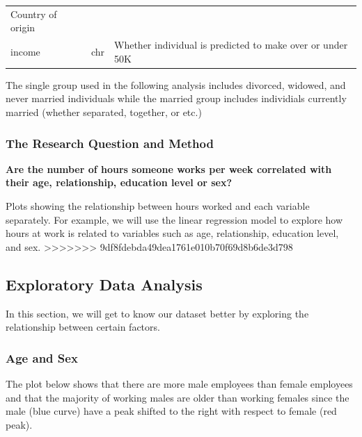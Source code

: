 \documentclass[]{article}
\begin{document}
\begin{longtable}[]{@{}lll@{}}
\begin{minipage}[t]{0.26\columnwidth}
Country of origin\strut
\end{minipage}\tabularnewline
\begin{minipage}[t]{0.35\columnwidth}\raggedright
income\strut
\end{minipage} & \begin{minipage}[t]{0.30\columnwidth}\raggedright
chr\strut
\end{minipage} & \begin{minipage}[t]{0.26\columnwidth}\raggedright
Whether individual is predicted to make over or under 50K\strut
\end{minipage}\tabularnewline
\bottomrule
\end{longtable}

The single group used in the following analysis includes divorced,
widowed, and never married individuals while the married group includes
individials currently married (whether separated, together, or etc.)

\hypertarget{the-research-question-and-method}{%
\subsubsection{The Research Question and
Method}\label{the-research-question-and-method}}

\textbf{Are the number of hours someone works per week correlated with
their age, relationship, education level or sex?}

Plots showing the relationship between hours worked and each variable
separately. For example, we will use the linear regression model to
explore how hours at work is related to variables such as age,
relationship, education level, and sex.
>>>>>>> 9df8fdebda49dea1761e010b70f69d8b6de3d798

\hypertarget{exploratory-data-analysis}{%
\subsection{Exploratory Data Analysis}\label{exploratory-data-analysis}}

In this section, we will get to know our dataset better by exploring the
relationship between certain factors.

\hypertarget{age-and-sex}{%
\subsubsection{Age and Sex}\label{age-and-sex}}

The plot below shows that there are more male employees than female
employees and that the majority of working males are older than working
females since the male (blue curve) have a peak shifted to the right
with respect to female (red peak).
\end{document}
